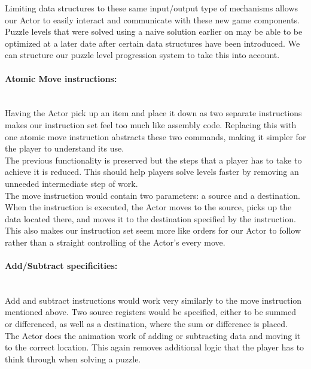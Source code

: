 Limiting data structures to these same input/output type of mechanisms allows our Actor to easily interact and communicate with these new game components.\\

Puzzle levels that were solved using a naive solution earlier on may be able to be optimized at a later date after certain data structures have been introduced. We can structure our puzzle level progression system to take this into account.\\

\paragraph{Atomic Move instructions:} ~\\
Having the Actor pick up an item and place it down as two separate instructions makes our instruction set feel too much like assembly code. Replacing this with one atomic move instruction abstracts these two commands, making it simpler for the player to understand its use.\\

The previous functionality is preserved but the steps that a player has to take to achieve it is reduced. This should help players solve levels faster by removing an unneeded intermediate step of work.\\

The move instruction would contain two parameters: a source and a destination. When the instruction is executed, the Actor moves to the source, picks up the data located there, and moves it to the destination specified by the instruction. This also makes our instruction set seem more like orders for our Actor to follow rather than a straight controlling of the Actor's every move.\\

\paragraph{Add/Subtract specificities:} ~\\
Add and subtract instructions would work very similarly to the move instruction mentioned above. Two source registers would be specified, either to be summed or differenced, as well as a destination, where the sum or difference is placed.\\

The Actor does the animation work of adding or subtracting data and moving it to the correct location. This again removes additional logic that the player has to think through when solving a puzzle.\\

